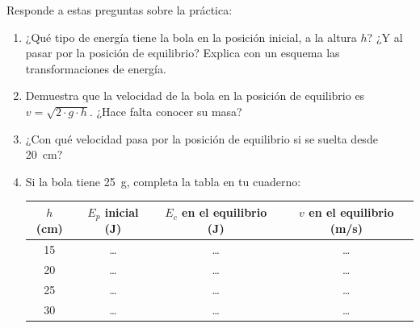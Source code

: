 \begin{exercise}
    Responde a estas preguntas sobre la práctica:
    \begin{enumerate}[label=\alph*)]
        \item ¿Qué tipo de energía tiene la bola en la posición inicial, a la altura \(h\)? ¿Y al pasar por la posición de equilibrio? Explica con un esquema las transformaciones de energía.
        \item Demuestra que la velocidad de la bola en la posición de equilibrio es \(v = \sqrt{2 \cdot g \cdot h}\). ¿Hace falta conocer su masa?
        \item ¿Con qué velocidad pasa por la posición de equilibrio si se suelta desde \qty{20}{\cm}?
        \item Si la bola tiene \qty{25}{\gram}, completa la tabla en tu cuaderno:
        \begin{center}
            {\small
            \begin{tabular}{@{}cccc@{}}
                \toprule
                \textbf{\(h\) (cm)} & \textbf{\(E_p\) inicial (J)} & \textbf{\(E_c\) en el equilibrio (J)} & \textbf{\(v\) en el equilibrio (m/s)} \\
                \midrule
                15 & \ldots & \ldots & \ldots \\[3pt]
                20 & \ldots & \ldots & \ldots \\[3pt]
                25 & \ldots & \ldots & \ldots \\[3pt]
                30 & \ldots & \ldots & \ldots \\
                \bottomrule
            \end{tabular}
            }
        \end{center}

\end{enumerate}
\end{exercise}
